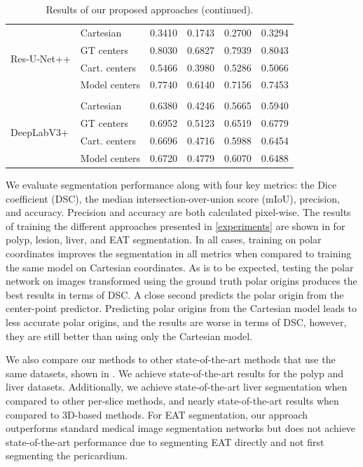 \begin{table}
\begin{tabularx}{\textwidth}{X X c c c c}
 \multirow{4}{7em}{{Res-U-Net++}}
& Cartesian & 0.3410 & 0.1743 & 0.2700 & 0.3294 \\
& GT centers & 0.8030 & 0.6827 & 0.7939 & 0.8043 \\
& Cart. centers & 0.5466 & 0.3980 & 0.5286 & 0.5066 \\
& Model centers & 0.7740 & 0.6140 & 0.7156 & 0.7453 \\ [1ex]
\hline \\ [-1.5ex]

 \multirow{4}{7em}{{DeepLabV3+}}
& Cartesian & 0.6380 & 0.4246 & 0.5665 & 0.5940 \\
& GT centers & 0.6952 & 0.5123 & 0.6519 & 0.6779 \\
& Cart. centers & 0.6696 & 0.4716 & 0.5988 & 0.6454 \\
& Model centers & 0.6720 & 0.4779 & 0.6070 & 0.6488 \\ [1ex]
\end{tabularx}
\caption{Results of our proposed approaches (continued).}
\label{table:results}
\end{table}

We evaluate segmentation performance along with four key metrics: the Dice coefficient (DSC), the median intersection-over-union score (mIoU), precision, and accuracy. Precision and accuracy are both calculated pixel-wise. The results of training the different approaches presented in \ref{experiments} are shown in  for polyp, lesion, liver, and EAT segmentation. In all cases, training on polar coordinates improves the segmentation in all metrics when compared to training the same model on Cartesian coordinates. As is to be expected, testing the polar network on images transformed using the ground truth polar origins produces the best results in terms of DSC. A close second predicts the polar origin from the center-point predictor. Predicting polar origins from the Cartesian model leads to less accurate polar origins, and the results are worse in terms of DSC, however, they are still better than using only the Cartesian model.

We also compare our methods to other state-of-the-art methods that use the same datasets, shown in . We achieve state-of-the-art results for the polyp and liver datasets. Additionally, we achieve state-of-the-art liver segmentation when compared to other per-slice methods, and nearly state-of-the-art results when compared to 3D-based methods. For EAT segmentation, our approach outperforms standard medical image segmentation networks but does not achieve state-of-the-art performance due to segmenting EAT directly and not first segmenting the pericardium.

